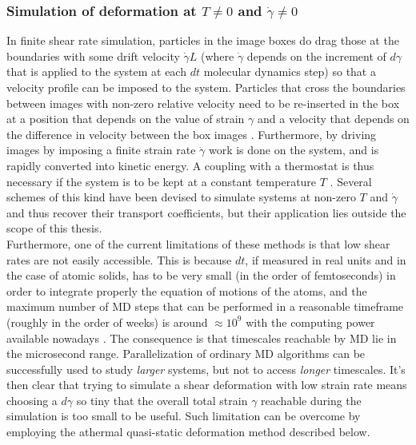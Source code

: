 \subsubsection{Simulation of deformation at $T \neq 0$ and $\dot{\gamma} \neq 0$}
In finite shear rate simulation, particles in the image boxes do drag those at the boundaries with some drift velocity $\dot{\gamma} L$ (where $\dot{\gamma}$ depends on the increment of $d\gamma$ that is applied to the system at each $dt$ molecular dynamics step) so that a velocity profile can be imposed to the system. Particles that cross the boundaries between images with non-zero relative velocity need to be re-inserted in the box at a position that depends on the value of strain $\gamma$ and a velocity that depends on the difference in velocity between the box images \cite{evans2008statistical}. Furthermore, by driving images by imposing a finite strain rate $\dot{\gamma}$ work is done on the system, and is rapidly converted into kinetic energy. A coupling with a thermostat is thus necessary if the system is to be kept at a constant temperature $T$ \cite{evans2008statistical}. Several schemes of this kind have been devised to simulate systems at non-zero $T$ and  $\dot{\gamma}$ and thus recover their transport coefficients, but their application lies outside the scope of this thesis. \\
Furthermore, one of the current limitations of these methods is that low shear rates are not easily accessible. This is because $dt$, if measured in real units and in the case of atomic solids, has to be very small (in the order of femtoseconds) in order to integrate properly the equation of motions of the atoms, and the maximum number of MD steps that can be performed in a reasonable timeframe (roughly in the order of weeks) is around $\approx 10^{9}$ with the computing power available nowadays \cite{voter2002extending}. The consequence is that timescales reachable by MD lie in the microsecond range. Parallelization of ordinary MD algorithms can be successfully used to study \emph{larger} systems, but not to access \emph{longer} timescales. It's then clear that trying to simulate a shear deformation with low strain rate means choosing a $d\gamma$ so tiny that the overall total strain $\gamma$ reachable during the simulation is too small to be useful. Such limitation can be overcome by employing the athermal quasi-static deformation method described below.

